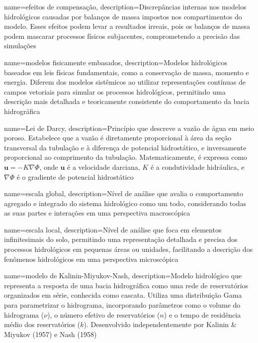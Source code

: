 {
    name=efeitos de compensação,
    description={Discrepâncias internas nos modelos hidrológicos causadas por balanços de massa impostos nos compartimentos do modelo. Esses efeitos podem levar a resultados irreais, pois os balanços de massa podem mascarar processos físicos subjacentes, comprometendo a precisão das simulações}
}

{
    name=modelos fisicamente embasados,
    description={Modelos hidrológicos baseados em leis físicas fundamentais, como a conservação de massa, momento e energia. Diferem dos modelos sistêmicos ao utilizar representações contínuas de campos vetoriais para simular os processos hidrológicos, permitindo uma descrição mais detalhada e teoricamente consistente do comportamento da bacia hidrográfica}
}

{
    name=Lei de Darcy,
    description={Princípio que descreve a vazão de água em meio poroso. Estabelece que a vazão é diretamente proporcional à área da seção transversal da tubulação e à diferença de potencial hidrostático, e inversamente proporcional ao comprimento da tubulação. Matematicamente, é expressa como $\textbf{u} = -K \nabla \Phi$, onde $\textbf{u}$ é a velocidade darciana, $K$ é a condutividade hidráulica, e $\nabla \Phi$ é o gradiente de potencial hidrostático}
}

{
    name=escala global,
    description={Nível de análise que avalia o comportamento agregado e integrado do sistema hidrológico como um todo, considerando todas as suas partes e interações em uma perspectiva macroscópica}
}

{
    name=escala local,
    description={Nível de análise que foca em elementos infinitesimais do solo, permitindo uma representação detalhada e precisa dos processos hidrológicos em pequenas áreas ou unidades, facilitando a descrição dos fenômenos hidrológicos em uma perspectiva microscópica}
}

{
    name=modelo de Kalinin-Miyukov-Nash,
    description={Modelo hidrológico que representa a resposta de uma bacia hidrográfica como uma rede de reservatórios organizados em série, conhecida como cascata. Utiliza uma distribuição Gama para parametrizar o hidrograma, incorporando parâmetros como o volume do hidrograma ($\nu$), o número efetivo de reservatórios ($n$) e o tempo de residência médio dos reservatórios ($k$). Desenvolvido independentemente por Kalinin \& Miyukov (1957) e Nash (1958)}
}

